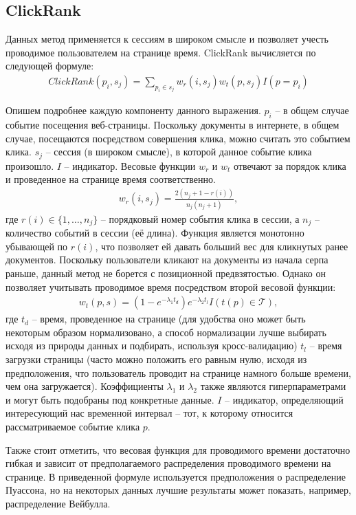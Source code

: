 \documentclass[diploma]{nanolab2015}
\begin{document}
\subsection{ClickRank}
Данных метод применяется к сессиям в широком смысле и позволяет учесть проводимое пользователем на странице время. ClickRank \cite{clickrank} вычисляется по следующей формуле:
\begin{align}
    ClickRank(p_i, s_j) = \sum_{p_i \in s_j} w_r(i, s_j) w_t(p, s_j) I(p=p_i)
\end{align}

Опишем подробнее каждую компоненту данного выражения. $p_i$ -- в общем случае событие посещения веб-страницы. Поскольку документы в интернете, в общем случае, посещаются посредством совершения клика, можно считать это событием клика. $s_j$ -- сессия (в широком смысле), в которой данное событие клика произошло. $I$ -- индикатор. Весовые функции $w_r$ и $w_t$ отвечают за порядок клика и проведенное на странице время соответственно.
\begin{align}
    w_r(i, s_j) = \frac{2(n_j + 1 - r(i))}{n_j(n_j + 1)},
\end{align}
где $r(i) \in \{1, \dots, n_j\}$ -- порядковый номер события клика в сессии, а $n_j$ -- количество событий в сессии (её длина). Функция является монотонно убывающей по $r(i)$, что позволяет ей давать больший вес для кликнутых ранее документов. Поскольку пользователи кликают на документы из начала серпа раньше, данный метод не борется с позиционной предвзятостью. Однако он позволяет учитывать проводимое время посредством второй весовой функции:
\begin{align}
    w_t(p, s) = (1 - e^{-\lambda_1 t_d})e^{-\lambda_2 t_l} I(t(p) \in \mathcal{T}),
\end{align}
где $t_d$ -- время, проведенное на странице (для удобства оно может быть некоторым образом нормализовано, а способ нормализации лучше выбирать исходя из природы данных и подбирать, используя кросс-валидацию) $t_l$ -- время загрузки страницы (часто можно положить его равным нулю, исходя из предположения, что пользователь проводит на странице намного больше времени, чем она загружается). Коэффициенты $\lambda_1$ и $\lambda_2$ также являются гиперпараметрами и могут быть подобраны под конкретные данные. $I$ -- индикатор, определяющий интересующий нас временной интервал -- тот, к которому относится рассматриваемое событие клика $p$.

Также стоит отметить, что весовая функция для проводимого времени достаточно гибкая и зависит от предполагаемого распределения проводимого времени на странице. В приведенной формуле используется предположения о распределение Пуассона, но на некоторых данных лучшие результаты может показать, например, распределение Вейбулла.
\end{document}
